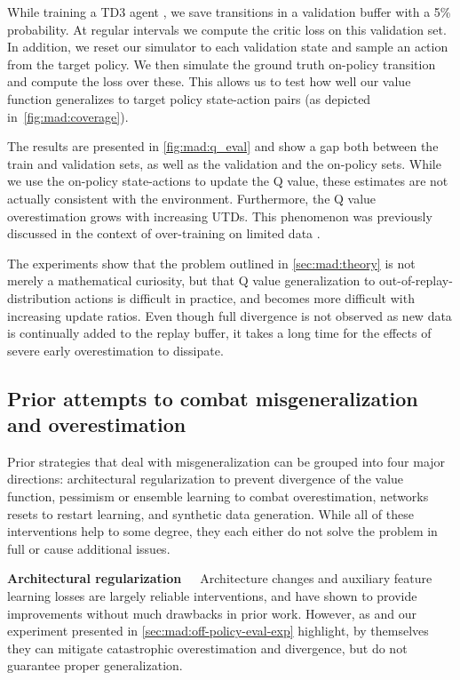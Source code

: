 While training a TD3 agent \parencite{fujimoto2018addressing}, we save transitions in a validation buffer with a 5\% probability.
At regular intervals we compute the critic loss on this validation set.
In addition, we reset our simulator to each validation state and sample an action from the target policy.
We then simulate the ground truth on-policy transition and compute the loss over these.
This allows us to test how well our value function generalizes to target policy state-action pairs (as depicted in~\autoref{fig:mad:coverage}).

The results are presented in \autoref{fig:mad:q_eval} and show a gap both between the train and validation sets, as well as the validation and the on-policy sets.
While we use the on-policy state-actions to update the Q value, these estimates are not actually consistent with the environment.
Furthermore, the Q value overestimation grows with increasing UTDs.
This phenomenon was previously discussed in the context of over-training on limited data \parencite{hussing2024dissecting}.

The experiments show that the problem outlined in \autoref{sec:mad:theory} is not merely a mathematical curiosity, but that Q value generalization to out-of-replay-distribution actions is difficult in practice, and becomes more difficult with increasing update ratios.
Even though full divergence is not observed as new data is continually added to the replay buffer, it takes a long time for the effects of severe early overestimation to dissipate.

\subsection{Prior attempts to combat misgeneralization and overestimation}
\label{sec:mad:prior}
Prior strategies that deal with misgeneralization can be grouped into four major directions: architectural regularization to prevent divergence of the value function, pessimism or ensemble learning to combat overestimation, networks resets to restart learning, and synthetic data generation.
While all of these interventions help to some degree, they each either do not solve the problem in full or cause additional issues.

\textbf{Architectural regularization}~~~Architecture changes \parencite{hussing2024dissecting,nauman2024overestimation,nauman2024bigger,lyle2024disentangling} and auxiliary feature learning losses \parencite{schwarzer2021dataefficient,zhao2023simplified,ni2024bridging,voelcker2024when} are largely reliable interventions, and have shown to provide improvements without much drawbacks in prior work.
However, as \textcite{hussing2024dissecting} and our experiment presented in \autoref{sec:mad:off-policy-eval-exp} highlight, by themselves they can mitigate catastrophic overestimation and divergence, but do not guarantee proper generalization. %

